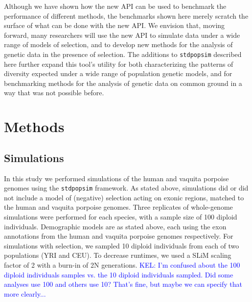 \documentclass[hidelinks]{article}
\newcommand{\stdpopsim}{\texttt{stdpopsim}\xspace}
\newcommand{\kelcomment}[1]{\textcolor{blue}{KEL: #1}}
\begin{document}
    Although we have shown how the new API can be used to benchmark the performance of different methods,
    the benchmarks shown here merely scratch the surface of what can be done with the new API.
    We envision that, moving forward, many researchers will use
    the new API to simulate data under a wide range of models of selection, and to develop
    new methods for the analysis of genetic data in the presence of selection. 
    The additions to \stdpopsim described here further expand this tool's utility for both 
    characterizing the patterns of diversity expected under a wide range of population genetic
    models, and for benchmarking methods for the analysis of genetic data
    on common ground
    in a way that was not possible before.

\section*{Methods}
    \label{methods}

    \subsection*{Simulations}
    In this study we performed simulations of the human and vaquita porpoise genomes
    using the \stdpopsim{} framework. As stated above, simulations did or did not include a model 
    of (negative) selection acting on exonic regions, matched to the human and vaquita porpoise genomes.
    Three replicates of whole-genome simulations were performed for each species, with 
    a sample size of 100 diploid individuals. Demographic models are as stated above, each
    using the exon annotations from the human and vaquita porpoise genomes respectively.
    For simulations with selection, we sampled 10 diploid individuals from each of two populations (YRI and CEU). 
    To decrease runtimes, we used a SLiM scaling factor of 2 with a burn-in of 2N generations. \kelcomment{I'm confused about the 100 diploid individuals samples vs. the 10 diploid individuals sampled. Did some analyses use 100 and others use 10? That's fine, but maybe we can specify that more clearly...}
\end{document}
